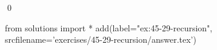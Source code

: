 
\begin{ex}
  \label{ex:45-29-recursion}
  
  \qed
\end{ex}
\begin{python0}
from solutions import *
add(label="ex:45-29-recursion",
    srcfilename='exercises/45-29-recursion/answer.tex')
\end{python0}
